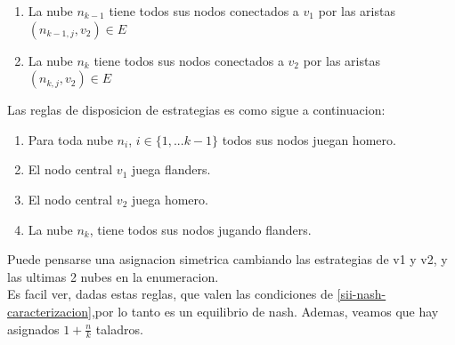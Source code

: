 \begin{enumerate}
\begin{enumerate}
		\item La nube $n_{k-1}$ tiene todos sus nodos conectados a $v_1$ por las aristas $(n_{k-1,j}, v_2) \in E$
		\item La nube $n_{k}$ tiene todos sus nodos conectados a $v_2$ por las aristas $(n_{k,j}, v_2) \in E$
	\end{enumerate}
	Las reglas de disposicion de estrategias es como sigue a continuacion:
	\begin{enumerate}
		\item Para toda nube $n_i$, $i \in\{1,...k-1\}$ todos sus nodos juegan homero.
		\item El nodo central $v_1$ juega flanders.
		\item El nodo central $v_2$ juega homero.
		\item La nube $n_k$, tiene todos sus nodos jugando flanders.
	\end{enumerate}
	Puede pensarse una asignacion simetrica cambiando las estrategias de v1 y v2, y las ultimas 2 nubes en la enumeracion.\\
	Es facil ver, dadas estas reglas, que valen las condiciones de \ref{sii-nash-caracterizacion},por lo tanto es un equilibrio de nash. Ademas, veamos que hay asignados $1 + \frac{n}{k}$ taladros.
\end{enumerate}


